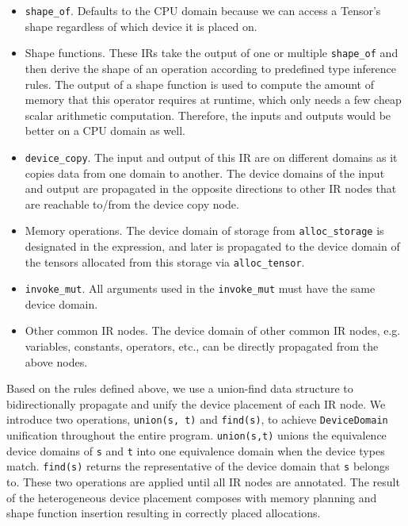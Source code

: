 \begin{itemize}
    \item \verb|shape_of|. Defaults to the CPU domain because we can access a Tensor's shape regardless of which device it is placed on.
    \item Shape functions. These IRs take the output of one or multiple \verb|shape_of| and then derive the shape of an operation according to predefined type inference rules. The output of a shape function is used to compute the amount of memory that this operator requires at runtime, which only needs a few cheap scalar arithmetic computation. Therefore, the inputs and outputs would be better on a CPU domain as well.
    \item \verb|device_copy|. The input and output of this IR are on different domains as it copies data from one domain to another. The device domains of the input and output are propagated in the opposite directions to other IR nodes that are reachable to/from the device copy node.
    \item Memory operations. The device domain of storage from \verb|alloc_storage| is designated in the expression, and later is propagated to the device domain of the tensors allocated from this storage via \verb|alloc_tensor|.
    \item \verb|invoke_mut|. All arguments used in the \verb|invoke_mut| must have the same device domain.
    \item Other common IR nodes. The device domain of other common IR nodes, e.g. variables, constants, operators, etc., can be directly propagated from the above nodes.
\end{itemize}

Based on the rules defined above, we use a union-find data structure to bidirectionally propagate and unify the device placement of each IR node. We introduce two operations, \texttt{union(s, t)} and \texttt{find(s)}, to achieve \texttt{DeviceDomain} unification throughout the entire program. \texttt{union(s,t)} unions the equivalence device domains of \texttt{s} and \texttt{t} into one equivalence domain when the device types match. \texttt{find(s)} returns the representative of the device domain that \texttt{s} belongs to. These two operations are applied until all IR nodes are annotated. The result of the heterogeneous device placement composes with memory planning and shape function insertion resulting in correctly placed allocations.

